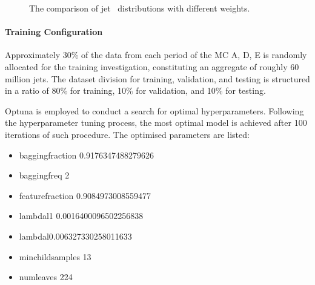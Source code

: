 \begin{figure}[htb]
	\centering
	 \quad
	\caption[]{
		The comparison of jet \pt~distributions with different weights. %
		\label{fig:QG-training-pt-weight-compare}
	}
\end{figure}

\paragraph{Training Configuration\\}

Approximately 30\% of the data from each period of the MC  A, D, E is randomly allocated for the training investigation, constituting an aggregate of roughly 60 million jets. 
The dataset division for training, validation, and testing is structured in a ratio of 80\% for training, 10\% for validation, and 10\% for testing.

Optuna is employed to conduct a search for optimal hyperparameters. Following the hyperparameter tuning process, the most optimal model is achieved after 100 iterations of such procedure. The optimised parameters are listed:

\begin{itemize}
	\item bagging\textunderscore fraction 0.9176347488279626
	\item bagging\textunderscore freq 2
	\item feature\textunderscore fraction 0.9084973008559477
	\item lambda\textunderscore l1 0.0016400096502256838
	\item lambda\textunderscore l0.006327330258011633
	\item min\textunderscore child\textunderscore samples 13
	\item num\textunderscore leaves 224
\end{itemize}

